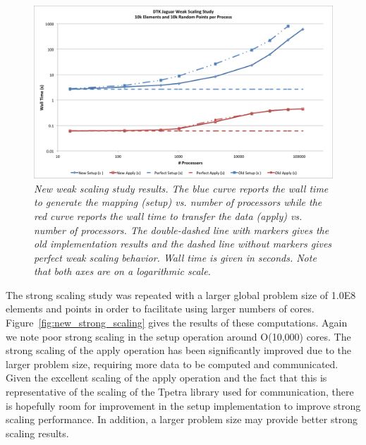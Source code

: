 \documentclass[note]{TechNote}
\begin{document}
\begin{figure}[h!]
  \centering
  \includegraphics[width=5.5in]{NewWeakScaling.png}
  \caption{\sl New weak scaling study results. The blue curve reports
    the wall time to generate the mapping (setup) vs. number of
    processors while the red curve reports the wall time to transfer
    the data (apply) vs. number of processors. The double-dashed line
    with markers gives the old implementation results and the dashed
    line without markers gives perfect weak scaling behavior. Wall
    time is given in seconds. Note that both axes are on a logarithmic
    scale. }
  \label{fig:new_weak_scaling}
\end{figure}

The strong scaling study was repeated with a larger global problem
size of 1.0E8 elements and points in order to facilitate using larger
numbers of cores. Figure~\ref{fig:new_strong_scaling} gives the
results of these computations. Again we note poor strong scaling in
the setup operation around O(10,000) cores. The strong scaling of the
apply operation has been significantly improved due to the larger
problem size, requiring more data to be computed and
communicated. Given the excellent scaling of the apply operation and
the fact that this is representative of the scaling of the Tpetra
library used for communication, there is hopefully room for
improvement in the setup implementation to improve strong scaling
performance. In addition, a larger problem size may provide better
strong scaling results.
\end{document}
